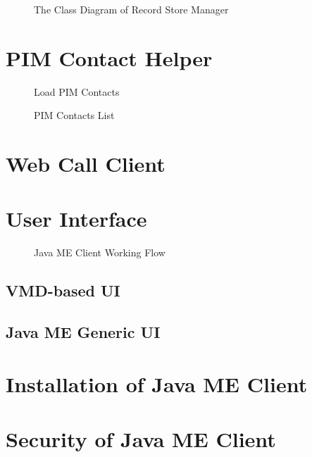 \begin{figure}[!hbtp]
\centering
{}
\caption{The Class Diagram of Record Store Manager}
\label{fig:TheClassDiagramofRecordStoreManager}
\end{figure}

\section{PIM Contact Helper}
\label{sec:JavaMEClient:PIMContactHelper}


\begin{figure}[!hbtp]
\centering
{}
\caption{Load PIM Contacts}
\label{fig:Load PIM Contacts}
\end{figure}


\begin{figure}[!hbtp]
\centering
{}
\caption{PIM Contacts List}
\label{fig:PIMContactsList}
\end{figure}

\section{Web Call Client}
\label{sec:JavaMEClient:WebCallClient}






\section{User Interface}
\label{sec:JavaMEClient:UserInterface}

\begin{figure}[!hbtp]
\centering
{}
\caption{Java ME Client Working Flow}
\label{fig:JavaMEClientWorkingFlow}
\end{figure}

\subsection{VMD-based UI}
\label{sec:JavaMEClient:UserInterface:VMDBasedUI}



\subsection{Java ME Generic UI}
\label{sec:JavaMEClient:UserInterface:JavaMEGenericUI}

\section{Installation of Java ME Client}
\label{sec:JavaMEClient:InstallationOfJavaMEClient}

\section{Security of Java ME Client}
\label{sec:JavaMEClient:SecurityOfJavaMEClient}

